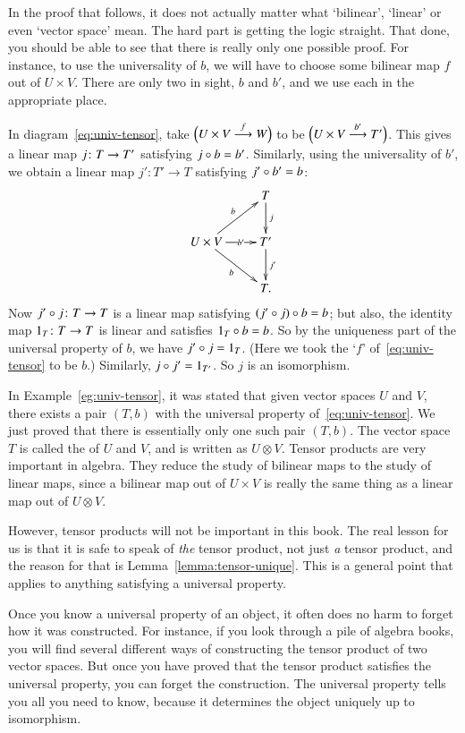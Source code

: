 In the proof that follows, it does not actually matter what `bilinear',
`linear' or even `vector space' mean.  The hard part is getting the logic
straight.  That done, you should be able to see that there is really only
one possible proof.  For instance, to use the universality of $b$, we will
have to choose some bilinear map $f$ out of $U\times V$.  There are only
two in sight, $b$ and $b'$, and we use each in the appropriate place.

\begin{pf}
In diagram~\eqref{eq:univ-tensor}, take $\Bigl(U \times V \stackrel{f}{\longrightarrow} W\Bigr)$
to be $\Bigl(U \times V \stackrel{b'}{\longrightarrow} T'\Bigr)$.  This gives a linear map
$j\from T \to T'$ satisfying $j \mathbin{\circ} b = b'$.  Similarly, using the
universality of $b'$, we obtain a linear map $j': T' \to T$ satisfying $j'
\mathbin{\circ} b' = b$:
\[
\xymatrix{
        &T \ar[d]^-j     \\
U \times V \ar[ur]^-b \ar[r]|-{b'} \ar[dr]_b      &
T' \ar[d]^{j'}  \\
&
T.
}
\]
Now $j' \of j\from T \to T$ is a linear map satisfying $(j' \mathbin{\circ} j) \mathbin{\circ} b =
b$; but also, the identity map $1_T\from T \to T$ is linear and satisfies
$1_T \mathbin{\circ} b = b$.  So by the uniqueness part of the universal property of
$b$, we have $j' \mathbin{\circ} j = 1_T$.  (Here we took the `$f$'
of~\eqref{eq:univ-tensor} to be $b$.)  Similarly, $j \mathbin{\circ} j' = 1_{T'}$.  So
$j$ is an isomorphism.
\end{pf}

In Example~\ref{eg:univ-tensor}, it was stated that given vector spaces $U$
and $V$, there exists a pair $(T, b)$ with the universal property
of~\eqref{eq:univ-tensor}.  We just proved that there is essentially only
one such pair $(T, b)$.  The vector space $T$ is called the  of $U$ and $V$, and is written as $U \otimes V$.%
%
%
Tensor products are very important in algebra.  They reduce the study of
bilinear maps to the study of linear maps, since a bilinear map out of $U
\times V$ is really the same thing as a linear map out of $U \otimes V$.

However, tensor products will not be important in this book.  The real
lesson for us is that it is safe to speak of \emph{the} tensor product, not
just \emph{a} tensor product, and the reason for that is
Lemma~\ref{lemma:tensor-unique}.  This is a general point that applies to
anything satisfying a universal property.

Once you know a universal property of an object, it often does no harm to
forget how it was constructed. For instance, if you look through a pile of
algebra books, you will find several different ways of constructing the
tensor product of two vector spaces.  But once you have proved that the
tensor product satisfies the universal property, you can forget the
construction.%
%
%
The universal property tells you all you need to know, because it
determines the object uniquely up to isomorphism.

